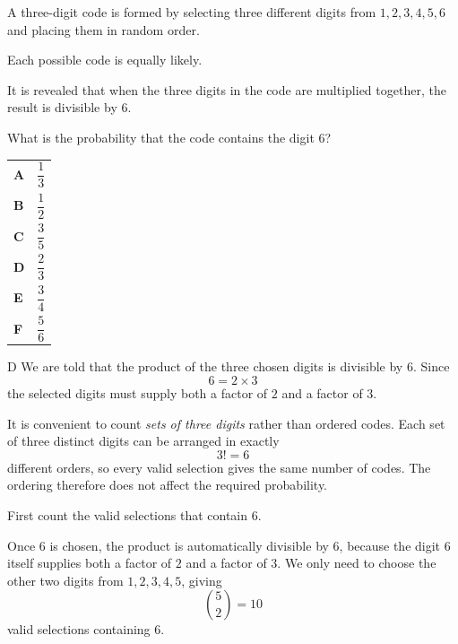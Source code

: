 \documentclass[11pt,a4paper]{article}
\begin{document}
\begin{enumerate}[label=\textbf{\arabic*.},leftmargin=*,itemsep=0pt,start=11]
A three-digit code is formed by selecting three different digits from $1,2,3,4,5,6$ and placing them in random order. 

Each possible code is equally likely.

It is revealed that when the three digits in the code are multiplied together, the result is divisible by $6$.

What is the probability that the code contains the digit $6$?

\par\vspace*{12pt}
\begin{tabularx}{\linewidth}{@{}>{\bfseries}l Y@{}}
A &
$\dfrac{1}{3}$
\\[0.8em]
B &
$\dfrac{1}{2}$
\\[0.8em]
C &
$\dfrac{3}{5}$
\\[0.8em]
D &
$\dfrac{2}{3}$
\\[0.8em]
E &
$\dfrac{3}{4}$
\\[0.8em]
F &
$\dfrac{5}{6}$
\\
\end{tabularx}

\begin{djsSolution}{D}
We are told that the product of the three chosen digits is divisible by \(6\). Since
\[
6=2\times3
\]
the selected digits must supply both a factor of \(2\) and a factor of \(3\).

It is convenient to count \emph{sets of three digits} rather than ordered codes. Each set of three distinct digits can be arranged in exactly
\[
3!=6
\]
different orders, so every valid selection gives the same number of codes. The ordering therefore does not affect the required probability.

First count the valid selections that contain \(6\).

Once \(6\) is chosen, the product is automatically divisible by \(6\), because the digit \(6\) itself supplies both a factor of \(2\) and a factor of \(3\). We only need to choose the other two digits from \(1,2,3,4,5\), giving
\[
\binom{5}{2}=10
\]
valid selections containing \(6\).


\end{djsSolution}
\end{enumerate}
\end{document}
